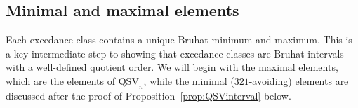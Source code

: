 \documentclass[submission]{FPSAC2024}
\newtheorem{lem}[equation]{Lemma}
\theoremstyle{definition}
\theoremstyle{remark}
\numberwithin{equation}{section}
\newcommand{\QSV}{\mathrm{QSV}}
\newcommand{\EP}{E_{pos}}
\newcommand{\EV}{E_{val}}
\begin{document}
%
%


\subsection{Minimal and maximal elements}
\label{sec:ex2}

Each excedance class contains a unique Bruhat minimum and maximum.  
This is a key intermediate step to showing that excedance classes are Bruhat intervals with a well-defined quotient order.  
We will begin with the maximal elements, which are the elements of $\QSV_{n}$, while the minimal ($321$-avoiding) elements are discussed after the proof of Proposition~\ref{prop:QSVinterval} below.
\end{document}
